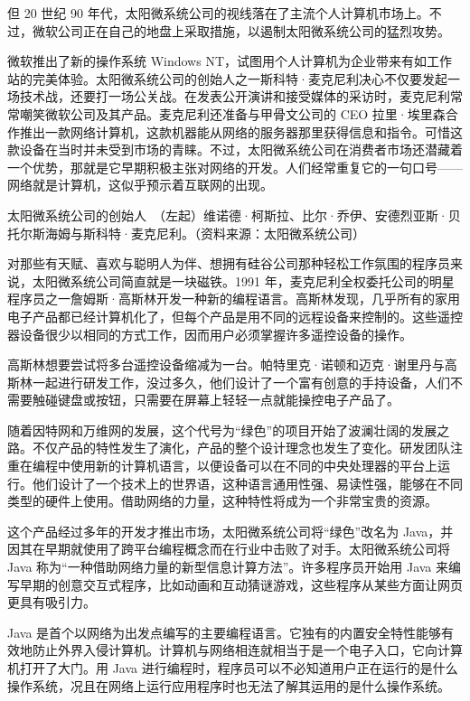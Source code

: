 \documentclass[12pt,UTF8]{ctexbook}
\begin{document}
但 20 世纪 90 年代，太阳微系统公司的视线落在了主流个人计算机市场上。不过，微软公司正在自己的地盘上采取措施，以遏制太阳微系统公司的猛烈攻势。

微软推出了新的操作系统 Windows NT，试图用个人计算机为企业带来有如工作站的完美体验。太阳微系统公司的创始人之一斯科特·麦克尼利决心不仅要发起一场技术战，还要打一场公关战。在发表公开演讲和接受媒体的采访时，麦克尼利常常嘲笑微软公司及其产品。麦克尼利还准备与甲骨文公司的 CEO 拉里·埃里森合作推出一款网络计算机，这款机器能从网络的服务器那里获得信息和指令。可惜这款设备在当时并未受到市场的青睐。不过，太阳微系统公司在消费者市场还潜藏着一个优势，那就是它早期积极主张对网络的开发。人们经常重复它的一句口号——网络就是计算机，这似乎预示着互联网的出现。



太阳微系统公司的创始人　（左起）维诺德·柯斯拉、比尔·乔伊、安德烈亚斯·贝托尔斯海姆与斯科特·麦克尼利。（资料来源：太阳微系统公司）

对那些有天赋、喜欢与聪明人为伴、想拥有硅谷公司那种轻松工作氛围的程序员来说，太阳微系统公司简直就是一块磁铁。1991 年，麦克尼利全权委托公司的明星程序员之一詹姆斯·高斯林开发一种新的编程语言。高斯林发现，几乎所有的家用电子产品都已经计算机化了，但每个产品是用不同的远程设备来控制的。这些遥控器设备很少以相同的方式工作，因而用户必须掌握许多遥控设备的操作。

高斯林想要尝试将多台遥控设备缩减为一台。帕特里克·诺顿和迈克·谢里丹与高斯林一起进行研发工作，没过多久，他们设计了一个富有创意的手持设备，人们不需要触碰键盘或按钮，只需要在屏幕上轻轻一点就能操控电子产品了。

随着因特网和万维网的发展，这个代号为“绿色”的项目开始了波澜壮阔的发展之路。不仅产品的特性发生了演化，产品的整个设计理念也发生了变化。研发团队注重在编程中使用新的计算机语言，以便设备可以在不同的中央处理器的平台上运行。他们设计了一个技术上的世界语，这种语言通用性强、易读性强，能够在不同类型的硬件上使用。借助网络的力量，这种特性将成为一个非常宝贵的资源。

这个产品经过多年的开发才推出市场，太阳微系统公司将“绿色”改名为 Java，并因其在早期就使用了跨平台编程概念而在行业中击败了对手。太阳微系统公司将 Java 称为“一种借助网络力量的新型信息计算方法”。许多程序员开始用 Java 来编写早期的创意交互式程序，比如动画和互动猜谜游戏，这些程序从某些方面让网页更具有吸引力。

Java 是首个以网络为出发点编写的主要编程语言。它独有的内置安全特性能够有效地防止外界入侵计算机。计算机与网络相连就相当于是一个电子入口，它向计算机打开了大门。用 Java 进行编程时，程序员可以不必知道用户正在运行的是什么操作系统，况且在网络上运行应用程序时也无法了解其运用的是什么操作系统。
\end{document}
